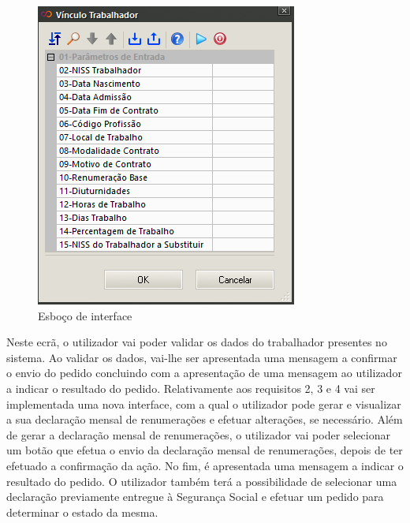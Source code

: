 \documentclass[sigplan]{acmart}
\begin{document}
\FloatBarrier
\begin{figure}[htbp]
	\centerline{\includegraphics[width=\linewidth]{figures/esboco_interface.png}}
	\caption{Esboço de interface}
	\label{fig4}
\end{figure}
\FloatBarrier
Neste ecrã, o utilizador vai poder validar os dados do trabalhador presentes no sistema. Ao validar os dados, vai-lhe ser apresentada uma mensagem a confirmar o envio do pedido concluindo com a apresentação de uma mensagem ao utilizador a indicar o resultado do pedido. Relativamente aos requisitos 2, 3 e 4 vai ser implementada uma nova interface, com a qual o utilizador pode gerar e visualizar a sua declaração mensal de renumerações e efetuar alterações, se necessário. Além de gerar a declaração mensal de renumerações, o utilizador vai poder selecionar um botão que efetua o envio da declaração mensal de renumerações, depois de ter efetuado a confirmação da ação. No fim, é apresentada uma mensagem a indicar o resultado do pedido. O utilizador também terá a possibilidade de selecionar uma declaração previamente entregue à Segurança Social e efetuar um pedido para determinar o estado da mesma.
\end{document}
